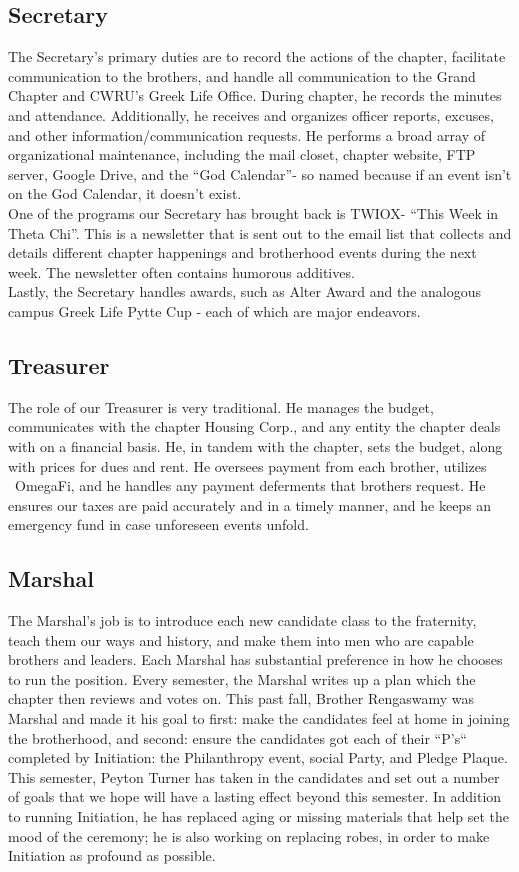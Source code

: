       \subsection*{Secretary}
	The Secretary's primary duties are to record the actions of the chapter, facilitate communication to the brothers, and handle all communication to the Grand Chapter and CWRU's Greek Life Office. During chapter, he records the minutes and attendance. Additionally, he receives and organizes officer reports, excuses, and other information/communication requests. He performs a broad array of organizational maintenance, including the mail closet, chapter website, FTP server, Google Drive, and the ``God Calendar''- so named because if an event isn't on the God Calendar, it doesn't exist. \\

	One of the programs our Secretary has brought back is TWIOX- ``This Week in Theta Chi''. This is a newsletter that is sent out to the email list that collects and details different chapter happenings and brotherhood events during the next week. The newsletter often contains humorous additives. \\

	Lastly, the Secretary handles awards, such as Alter Award and the analogous campus Greek Life Pytte Cup - each of which are major endeavors.
	
      \subsection*{Treasurer}
	The role of our Treasurer is very traditional. He manages the budget, communicates with the chapter Housing Corp., and any entity the chapter deals with on a financial basis. He, in tandem with the chapter, sets the budget, along with prices for dues and rent. He oversees payment from each brother, utilizes  OmegaFi, and he handles any payment deferments that brothers request. He ensures our taxes are paid accurately and in a timely manner, and he keeps an emergency fund in case unforeseen events unfold. 
      
      \subsection*{Marshal}
	The Marshal's job is to introduce each new candidate class to the fraternity, teach them our ways and history, and make them into men who are capable brothers and leaders. Each Marshal has substantial preference in how he chooses to run the position. Every semester, the Marshal writes up a plan which the chapter then reviews and votes on. This past fall, Brother Rengaswamy was Marshal and made it his goal to first: make the candidates feel at home in joining the brotherhood, and second: ensure the candidates got each of their ``P's`` completed by Initiation: the Philanthropy event, social Party, and Pledge Plaque. This semester, Peyton Turner has taken in the candidates and set out a number of goals that we hope will have a lasting effect beyond this semester. In addition to running Initiation, he has replaced aging or missing materials that help set the mood of the ceremony; he is also working on replacing robes, in order to make Initiation as profound as possible. 
	
